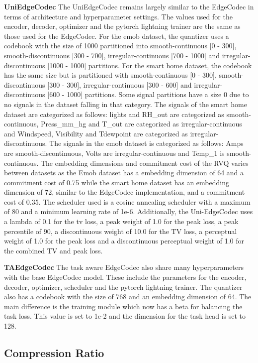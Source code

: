 \textbf{UniEdgeCodec} The UniEdgeCodec remains largely similar to the EdgeCodec in terms of architecture and hyperparameter settings. The values used for the encoder, decoder, optimizer and the pytorch lightning trainer are the same as those used for the EdgeCodec. For the emob dataset, the quantizer uses a codebook with the size of 1000 partitioned into smooth-continuous [0 - 300], smooth-discontinuous [300 - 700], irregular-continuous [700 - 1000] and irregular-discontinuous [1000 - 1000] partitions. For the smart home dataset, the codebook has the same size but is partitioned with smooth-continuous [0 - 300], smooth-discontinuous [300 - 300], irregular-continuous [300 - 600] and irregular-discontinuous [600 - 1000] partitions. Some signal partitions have a size 0 due to no signals in the dataset falling in that category. The signals of the smart home dataset are categorized as follows: lights and RH\_out are categorized as smooth-continuous, Press\_mm\_hg and T\_out are categorized as irregular-continuous and Windspeed, Visibility and Tdewpoint are categorized as irregular-discontinuous. The signals in the emob dataset is categorized as follows: Amps are smooth-discontinuous, Volts are irregular-continuous and Temp\_1 is smooth-continuous. The embedding dimensions and commitment cost of the RVQ varies between datasets as the Emob dataset has a embedding dimension of 64 and a commitment cost of 0.75 while the smart home dataset has an embedding dimension of 72, similar to the EdgeCodec implementation, and a commitment cost of 0.35. The scheduler used is a cosine annealing scheduler with a maximum of 80 and a minimum learning rate of 1e-6. Additionally, the Uni-EdgeCodec uses a lambda of 0.1 for the tv loss, a peak weight of 1.0 for the peak loss, a peak percentile of 90, a discontinuous weight of 10.0 for the TV loss, a perceptual weight of 1.0 for the peak loss and a discontinuous perceptual weight of 1.0 for the combined TV and peak loss.

\textbf{TAEdgeCodec} The task aware EdgeCodec also share many hyperparameters with the base EdgeCodec model. These include the parameters for the encoder, decoder, optimizer, scheduler and the pytorch lightning trainer. The quantizer also has a codebook with the size of 768 and an embedding dimension of 64. The main difference is the training module which now has a beta for balancing the task loss. This value is set to 1e-2 and the dimension for the task head is set to 128.

\subsection{Compression Ratio}


